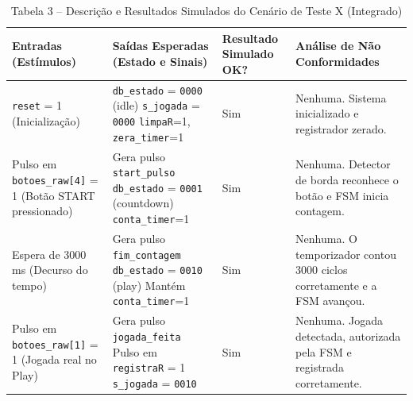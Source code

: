 \documentclass[a4paper,12pt,twoside]{article}
\begin{document}
  \begin{table}[htbp]
  \centering
  \caption{Tabela 3 -- Descrição e Resultados Simulados do Cenário de Teste X (Integrado)}
  \begin{tabular}{|>{\centering\arraybackslash}p{}|>{\centering\arraybackslash}p{}
  |>{\centering\arraybackslash}p{}|>{\centering\arraybackslash}p{}|}
  \hline
  \textbf{Entradas (Estímulos)} & \textbf{Saídas Esperadas (Estado e Sinais)} & \textbf{Resultado Simulado
  OK?} & \textbf{Análise de Não Conformidades} \\ \hline


  \texttt{reset} = 1 \newline (Inicialização) &
  \texttt{db\_estado} = \texttt{0000} (idle) \newline \texttt{s\_jogada} = \texttt{0000} \newline
  \texttt{limpaR}=1, \texttt{zera\_timer}=1 &
  Sim &
  Nenhuma. Sistema inicializado e registrador zerado. \\ \hline


  Pulso em \texttt{botoes\_raw[4]} = 1 \newline (Botão START pressionado) &
  Gera pulso \texttt{start\_pulso} \newline \texttt{db\_estado} = \texttt{0001} (countdown) \newline
  \texttt{conta\_timer}=1 &
  Sim &
  Nenhuma. Detector de borda reconhece o botão e FSM inicia contagem. \\ \hline


  Espera de 3000 ms \newline (Decurso do tempo) &
  Gera pulso \texttt{fim\_contagem} \newline \texttt{db\_estado} = \texttt{0010} (play) \newline Mantém
  \texttt{conta\_timer}=1 &
  Sim &
  Nenhuma. O temporizador contou 3000 ciclos corretamente e a FSM avançou. \\ \hline


  Pulso em \texttt{botoes\_raw[1]} = 1 \newline (Jogada real no Play) &
  Gera pulso \texttt{jogada\_feita} \newline Pulso em \texttt{registraR} = 1 \newline \texttt{s\_jogada} =
  \texttt{0010} &
  Sim &
  Nenhuma. Jogada detectada, autorizada pela FSM e registrada corretamente. \\ \hline


  \end{tabular}
  \end{table}
\end{document}
